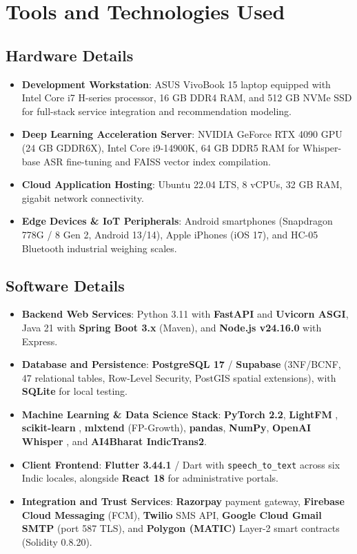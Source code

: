 \section{Tools and Technologies Used}
\label{sec:Tools}

\subsection{Hardware Details}
\label{subsec:Hw_Spec}
\begin{itemize}[leftmargin=1.5cm]
	\item \textbf{Development Workstation}: ASUS VivoBook 15 laptop equipped with Intel Core i7 H-series processor, 16 GB DDR4 RAM, and 512 GB NVMe SSD for full-stack service integration and recommendation modeling.
	\item \textbf{Deep Learning Acceleration Server}: NVIDIA GeForce RTX 4090 GPU (24 GB GDDR6X), Intel Core i9-14900K, 64 GB DDR5 RAM for Whisper-base ASR fine-tuning and FAISS vector index compilation.
	\item \textbf{Cloud Application Hosting}: Ubuntu 22.04 LTS, 8 vCPUs, 32 GB RAM, gigabit network connectivity.
	\item \textbf{Edge Devices \& IoT Peripherals}: Android smartphones (Snapdragon 778G / 8 Gen 2, Android 13/14), Apple iPhones (iOS 17), and HC-05 Bluetooth industrial weighing scales.
\end{itemize}

\subsection{Software Details}
\label{subsec:Sw_Spec}
\begin{itemize}[leftmargin=1.5cm]
	\item \textbf{Backend Web Services}: Python 3.11 with \textbf{FastAPI} and \textbf{Uvicorn ASGI}, Java 21 with \textbf{Spring Boot 3.x} (Maven), and \textbf{Node.js v24.16.0} with Express.
	\item \textbf{Database and Persistence}: \textbf{PostgreSQL 17} / \textbf{Supabase} (3NF/BCNF, 47 relational tables, Row-Level Security, PostGIS spatial extensions), with \textbf{SQLite} for local testing.
	\item \textbf{Machine Learning \& Data Science Stack}: \textbf{PyTorch 2.2}, \textbf{LightFM} \cite{Kula2015}, \textbf{scikit-learn} \cite{Pedregosa2011}, \textbf{mlxtend} (FP-Growth), \textbf{pandas}, \textbf{NumPy}, \textbf{OpenAI Whisper} \cite{Hannun2014}, and \textbf{AI4Bharat IndicTrans2}.
	\item \textbf{Client Frontend}: \textbf{Flutter 3.44.1} / Dart \cite{Flutter2024} with \texttt{speech\_to\_text} \cite{PubdevSTT} across six Indic locales, alongside \textbf{React 18} for administrative portals.
	\item \textbf{Integration and Trust Services}: \textbf{Razorpay} payment gateway, \textbf{Firebase Cloud Messaging} (FCM), \textbf{Twilio} SMS API, \textbf{Google Cloud Gmail SMTP} (port 587 TLS), and \textbf{Polygon (MATIC)} Layer-2 smart contracts (Solidity 0.8.20).
\end{itemize}

